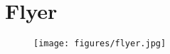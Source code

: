 \newpage
\section{Flyer}

\begin{figure}[H]\centering
    \texttt{[image: figures/flyer.jpg]}
    \label{fig:figure9}
\end{figure}
